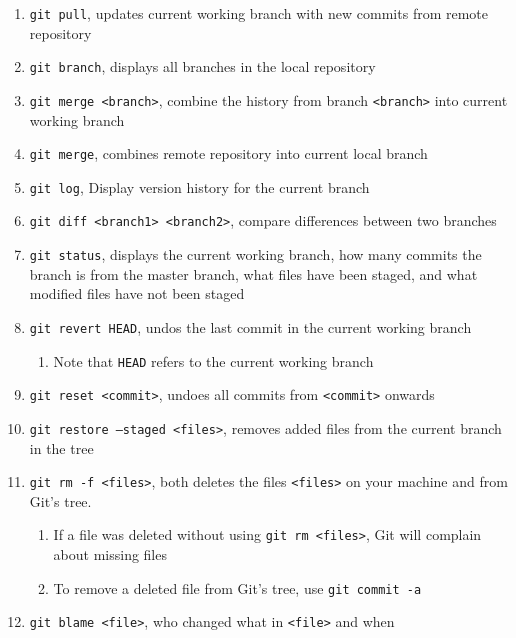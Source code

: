 \documentclass[11pt]{article}
\begin{document}
\begin{enumerate}
    \item \texttt{git pull}, updates current working branch with new commits from remote repository
    \item \texttt{git branch}, displays all branches in the local repository
    \item \texttt{git merge <branch>}, combine the history from branch \texttt{<branch>} into current working branch
    \item \texttt{git merge}, combines remote repository into current local branch
    \item \texttt{git log}, Display version history for the current branch
    \item \texttt{git diff <branch1> <branch2>}, compare differences between two branches
    \item \texttt{git status}, displays the current working branch, how many commits the branch is from the master branch, what files have been staged, and what modified files have not been staged
    \item \texttt{git revert HEAD}, undos the last commit in the current working branch
    \begin{enumerate}
        \item Note that \texttt{HEAD} refers to the current working branch
    \end{enumerate}
    \item \texttt{git reset <commit>}, undoes all commits from \texttt{<commit>} onwards
    \item \texttt{git restore --staged <files>}, removes added files from the current branch in the tree
    \item \texttt{git rm -f <files>}, both deletes the files \texttt{<files>} on your machine and from Git's tree.
    \begin{enumerate}
        \item If a file was deleted without using \texttt{git rm <files>}, Git will complain about missing files
        \item To remove a deleted file from Git's tree, use \texttt{git commit -a}
    \end{enumerate}
    \item \texttt{git blame <file>}, who changed what in \texttt{<file>} and when
\end{enumerate}
\end{document}
